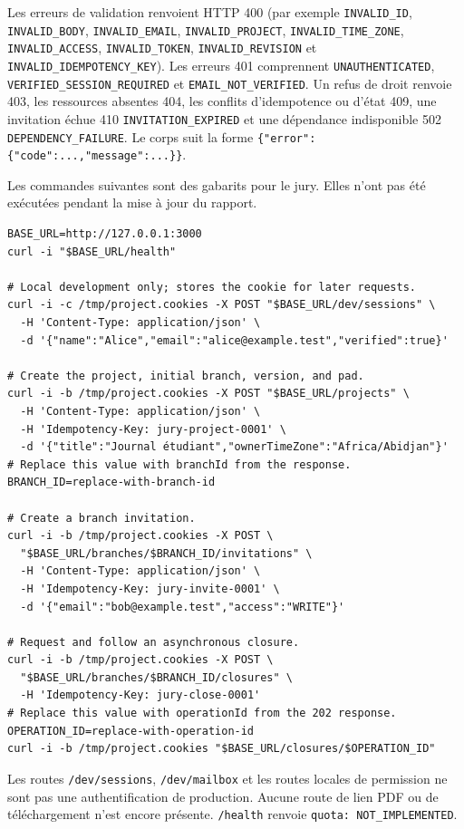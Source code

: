 Les erreurs de validation renvoient HTTP 400 (par exemple \texttt{INVALID\_ID}, \texttt{INVALID\_BODY}, \texttt{INVALID\_EMAIL}, \texttt{INVALID\_PROJECT}, \texttt{INVALID\_TIME\_ZONE}, \texttt{INVALID\_ACCESS}, \texttt{INVALID\_TOKEN}, \texttt{INVALID\_REVISION} et \texttt{INVALID\_IDEMPOTENCY\_KEY}). Les erreurs 401 comprennent \texttt{UNAUTHENTICATED}, \texttt{VERIFIED\_SESSION\_REQUIRED} et \texttt{EMAIL\_NOT\_VERIFIED}. Un refus de droit renvoie 403, les ressources absentes 404, les conflits d'idempotence ou d'état 409, une invitation échue 410 \texttt{INVITATION\_EXPIRED} et une dépendance indisponible 502 \texttt{DEPENDENCY\_FAILURE}. Le corps suit la forme \texttt{\{"error":\{"code":...,"message":...\}\}}.

Les commandes suivantes sont des gabarits pour le jury. Elles n'ont pas été exécutées pendant la mise à jour du rapport.

\begin{verbatim}
BASE_URL=http://127.0.0.1:3000
curl -i "$BASE_URL/health"

# Local development only; stores the cookie for later requests.
curl -i -c /tmp/project.cookies -X POST "$BASE_URL/dev/sessions" \
  -H 'Content-Type: application/json' \
  -d '{"name":"Alice","email":"alice@example.test","verified":true}'

# Create the project, initial branch, version, and pad.
curl -i -b /tmp/project.cookies -X POST "$BASE_URL/projects" \
  -H 'Content-Type: application/json' \
  -H 'Idempotency-Key: jury-project-0001' \
  -d '{"title":"Journal étudiant","ownerTimeZone":"Africa/Abidjan"}'
# Replace this value with branchId from the response.
BRANCH_ID=replace-with-branch-id

# Create a branch invitation.
curl -i -b /tmp/project.cookies -X POST \
  "$BASE_URL/branches/$BRANCH_ID/invitations" \
  -H 'Content-Type: application/json' \
  -H 'Idempotency-Key: jury-invite-0001' \
  -d '{"email":"bob@example.test","access":"WRITE"}'

# Request and follow an asynchronous closure.
curl -i -b /tmp/project.cookies -X POST \
  "$BASE_URL/branches/$BRANCH_ID/closures" \
  -H 'Idempotency-Key: jury-close-0001'
# Replace this value with operationId from the 202 response.
OPERATION_ID=replace-with-operation-id
curl -i -b /tmp/project.cookies "$BASE_URL/closures/$OPERATION_ID"
\end{verbatim}

Les routes \texttt{/dev/sessions}, \texttt{/dev/mailbox} et les routes locales de permission ne sont pas une authentification de production. Aucune route de lien PDF ou de téléchargement n'est encore présente. \texttt{/health} renvoie \texttt{quota: NOT\_IMPLEMENTED}.

